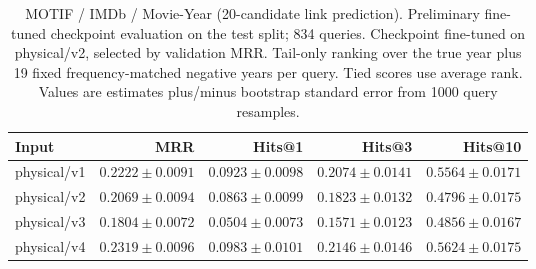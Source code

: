 \begin{table}[t]
\centering
\small
\begin{tabular}{lrrrr}
\toprule
Input & MRR & Hits@1 & Hits@3 & Hits@10 \\
\midrule
physical/v1 & $0.2222 \pm 0.0091$ & $0.0923 \pm 0.0098$ & $0.2074 \pm 0.0141$ & $0.5564 \pm 0.0171$ \\
physical/v2 & $0.2069 \pm 0.0094$ & $0.0863 \pm 0.0099$ & $0.1823 \pm 0.0132$ & $0.4796 \pm 0.0175$ \\
physical/v3 & $0.1804 \pm 0.0072$ & $0.0504 \pm 0.0073$ & $0.1571 \pm 0.0123$ & $0.4856 \pm 0.0167$ \\
physical/v4 & $0.2319 \pm 0.0096$ & $0.0983 \pm 0.0101$ & $0.2146 \pm 0.0146$ & $0.5624 \pm 0.0175$ \\
\bottomrule
\end{tabular}
\caption{MOTIF / IMDb / Movie-Year (20-candidate link prediction). Preliminary fine-tuned checkpoint evaluation on the test split; 834 queries. Checkpoint fine-tuned on physical/v2, selected by validation MRR. Tail-only ranking over the true year plus 19 fixed frequency-matched negative years per query. Tied scores use average rank. Values are estimates plus/minus bootstrap standard error from 1000 query resamples.}
\label{tab:motif-movie_year-link_prediction}
\end{table}
